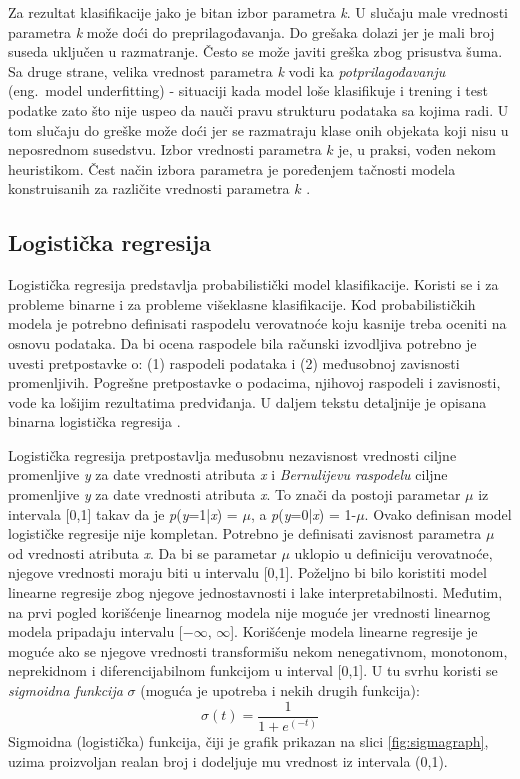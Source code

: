 \documentclass[12pt,oneside]{memoir}
\begin{document}
Za rezultat klasifikacije jako je bitan izbor parametra \textit{k}. U slučaju male vrednosti parametra \textit{k} može doći do preprilagođavanja. Do grešaka dolazi jer je mali broj suseda uključen u razmatranje. Često se može javiti greška zbog prisustva šuma. Sa druge strane, velika vrednost parametra \textit{k} vodi ka \textit{potprilagođavanju} (eng.~model underfitting) - situaciji kada model loše klasifikuje i trening i test podatke zato što nije uspeo da nauči pravu strukturu podataka sa kojima radi. U tom slučaju do greške može doći jer se razmatraju klase onih objekata koji nisu u neposrednom susedstvu. Izbor vrednosti parametra $k$ je, u praksi, vođen nekom heuristikom. Čest način izbora parametra je poređenjem tačnosti modela konstruisanih za različite vrednosti parametra $k$ \cite{mladen, mitic, aggarwal}.

\subsection{Logistička regresija}

Logistička regresija predstavlja probabilistički model klasifikacije. Koristi se i za probleme binarne i za probleme višeklasne klasifikacije. Kod probabilističkih modela je potrebno definisati raspodelu verovatnoće koju kasnije treba oceniti na osnovu podataka. Da bi ocena raspodele bila računski izvodljiva potrebno je uvesti pretpostavke o: (1) raspodeli podataka i (2) međusobnoj zavisnosti promenljivih. Pogrešne pretpostavke o podacima, njihovoj raspodeli i zavisnosti, vode ka lošijim rezultatima predviđanja. U daljem tekstu detaljnije je opisana binarna logistička regresija \cite{mladen}.

Logistička regresija pretpostavlja međusobnu nezavisnost vrednosti ciljne promenljive \textit{y} za date vrednosti atributa \textit{x} i \textit{Bernulijevu raspodelu} ciljne promenljive \textit{y} za date vrednosti atributa \textit{x}. To znači da postoji parametar  $\mu$ iz intervala [0,1] takav da je  \textit{p}(\textit{y}=1|\textit{x}) = $\mu$, a  \textit{p}(\textit{y}=0|\textit{x}) = 1-$\mu$. Ovako definisan model logističke regresije nije kompletan. Potrebno je definisati zavisnost parametra $\mu$ od vrednosti atributa \textit{x}. Da bi se parametar $\mu$ uklopio u definiciju verovatnoće, njegove vrednosti moraju biti u intervalu [0,1]. Poželjno bi bilo koristiti model linearne regresije zbog njegove jednostavnosti i lake interpretabilnosti. Međutim, na prvi pogled korišćenje linearnog modela nije moguće jer vrednosti linearnog modela pripadaju intervalu [$-\infty$, $\infty$]. Korišćenje modela linearne regresije je moguće ako se njegove vrednosti transformišu nekom nenegativnom, monotonom, neprekidnom i diferencijabilnom funkcijom u interval [0,1]. U tu svrhu koristi se \textit{sigmoidna funkcija} $\sigma$ (moguća je upotreba i nekih drugih funkcija):
$$ \sigma(t) = \frac{\mathrm{1}}{\mathrm{1} + e^{(- t)}} $$
Sigmoidna (logistička) funkcija, čiji je grafik prikazan na slici \ref{fig:sigmagraph}, uzima proizvoljan realan broj i dodeljuje mu vrednost iz intervala (0,1). 
\end{document}
